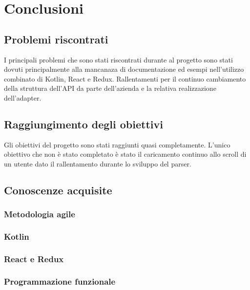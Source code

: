 
\chapter{Conclusioni}
\label{cap:conclusioni}

\section{Problemi riscontrati}
I principali problemi che sono stati riscontrati durante al progetto sono stati dovuti principalmente alla mancanaza di documentazione ed esempi nell'utilizzo combinato di Kotlin, React e Redux. Rallentamenti per il continuo cambiamento della struttura dell'API da parte dell'azienda e la relativa realizzazione dell'adapter.

\section{Raggiungimento degli obiettivi}
Gli obiettivi del progetto sono stati raggiunti quasi completamente. L'unico obiettivo che non è stato completato è stato il caricamento continuo allo scroll di un utente dato il rallentamento durante lo sviluppo del parser.

\section{Conoscenze acquisite}
\subsection{Metodologia agile}
\subsection{Kotlin}
\subsection{React e Redux}
\subsection{Programmazione funzionale}
